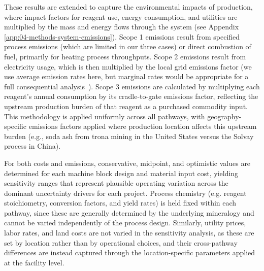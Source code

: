 \documentclass{article}
\renewcommand\_{\textunderscore\allowbreak}
\begin{document}
These results are extended to capture the environmental impacts of production, where impact factors for reagent use, energy consumption, and utilities are multiplied by the mass and energy flows through the system (see Appendix \ref{app:04-methods-system-emissions}). Scope 1 emissions result from specified process emissions (which are limited in our three cases) or direct combustion of fuel, primarily for heating process throughputs. Scope 2 emissions result from electricity usage, which is then multiplied by the local grid emissions factor (we use average emission rates here, but marginal rates would be appropriate for a full consequential analysis~\cite{nationalacademiesofscienceengineeringandmedicineAssessmentTechnologiesImproving2021}). Scope 3 emissions are calculated by multiplying each reagent's annual consumption by its cradle-to-gate emissions factor, reflecting the upstream production burden of that reagent as a purchased commodity input. This methodology is applied uniformly across all pathways, with geography-specific emissions factors applied where production location affects this upstream burden (e.g., soda ash from trona mining in the United States versus the Solvay process in China). 

For both costs and emissions, conservative, midpoint, and optimistic values are determined for each machine block design and material input cost, yielding sensitivity ranges that represent plausible operating variation across the dominant uncertainty drivers for each project. Process chemistry (e.g. reagent stoichiometry, conversion factors, and yield rates) is held fixed within each pathway, since these are generally determined by the underlying mineralogy and cannot be varied independently of the process design. Similarly, utility prices, labor rates, and land costs are not varied in the sensitivity analysis, as these are set by location rather than by operational choices, and their cross-pathway differences are instead captured through the location-specific parameters applied at the facility level.
\end{document}
